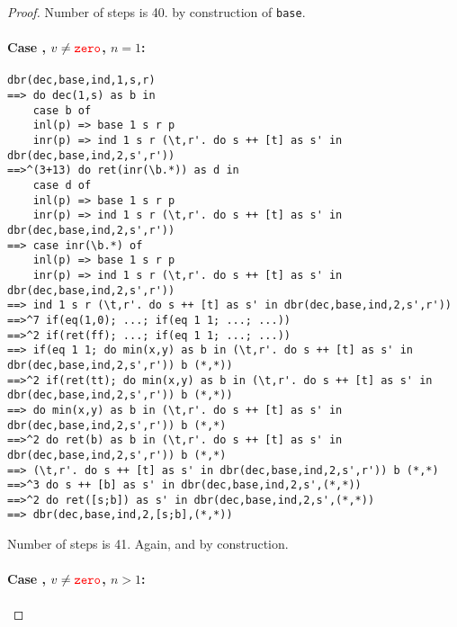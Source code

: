 \begin{proof}
Number of steps is 40.  by construction of \texttt{base}. 

\paragraph{\textbf{Case} , $v \ne {\color{red}{\mathtt{zero}}}$, $n = 1$:}
\begin{verbatim}
dbr(dec,base,ind,1,s,r) 
==> do dec(1,s) as b in 
    case b of
    inl(p) => base 1 s r p
    inr(p) => ind 1 s r (\t,r'. do s ++ [t] as s' in dbr(dec,base,ind,2,s',r')) 
==>^(3+13) do ret(inr(\b.*)) as d in 
    case d of
    inl(p) => base 1 s r p 
    inr(p) => ind 1 s r (\t,r'. do s ++ [t] as s' in dbr(dec,base,ind,2,s',r')) 
==> case inr(\b.*) of
    inl(p) => base 1 s r p 
    inr(p) => ind 1 s r (\t,r'. do s ++ [t] as s' in dbr(dec,base,ind,2,s',r')) 
==> ind 1 s r (\t,r'. do s ++ [t] as s' in dbr(dec,base,ind,2,s',r')) 
==>^7 if(eq(1,0); ...; if(eq 1 1; ...; ...))
==>^2 if(ret(ff); ...; if(eq 1 1; ...; ...))
==> if(eq 1 1; do min(x,y) as b in (\t,r'. do s ++ [t] as s' in dbr(dec,base,ind,2,s',r')) b (*,*))
==>^2 if(ret(tt); do min(x,y) as b in (\t,r'. do s ++ [t] as s' in dbr(dec,base,ind,2,s',r')) b (*,*))
==> do min(x,y) as b in (\t,r'. do s ++ [t] as s' in dbr(dec,base,ind,2,s',r')) b (*,*)
==>^2 do ret(b) as b in (\t,r'. do s ++ [t] as s' in dbr(dec,base,ind,2,s',r')) b (*,*) 
==> (\t,r'. do s ++ [t] as s' in dbr(dec,base,ind,2,s',r')) b (*,*) 
==>^3 do s ++ [b] as s' in dbr(dec,base,ind,2,s',(*,*))
==>^2 do ret([s;b]) as s' in dbr(dec,base,ind,2,s',(*,*))
==> dbr(dec,base,ind,2,[s;b],(*,*))
\end{verbatim}

Number of steps is 41.
Again,  and 
 by construction. 

\paragraph{\textbf{Case} , $v \ne {\color{red}{\mathtt{zero}}}$, $n > 1$:}


\end{proof}
